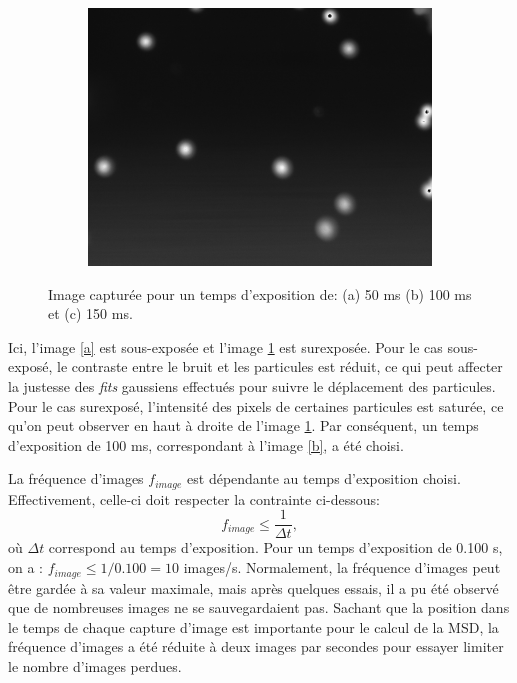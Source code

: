 \documentclass[11pt,letterpaper]{article}
\begin{document}
\begin{figure}[H]
\begin{subfigure}{0.3\textwidth}
    \includegraphics[width=\textwidth]{essai_10um_1im_150ms.png}
    \caption{}
    \label{c}
  \end{subfigure}
  \caption{Image capturée pour un temps d'exposition de: (a) 50 ms (b) 100 ms et (c) 150 ms.}
      \label{exposition}
\end{figure}
Ici, l'image \ref{a} est sous-exposée et l'image \ref{c} est surexposée. Pour le cas sous-exposé, le contraste entre
le bruit et les particules est réduit, ce qui peut affecter la justesse des \textit{fits} gaussiens effectués pour suivre
le déplacement des particules. Pour le cas surexposé, l'intensité des pixels de certaines particules est saturée, ce qu'on peut
observer en haut à droite de l'image \ref{c}. Par conséquent, un temps d'exposition de 100 ms, correspondant à l'image \ref{b}, a été choisi.

La fréquence d'images $f_{image}$ est dépendante au temps d'exposition choisi. Effectivement, celle-ci doit respecter la contrainte
ci-dessous:
\begin{equation*}
  f_{image}\leq \frac{1}{\Delta t},
\end{equation*}
où $\Delta t$ correspond au temps d'exposition. Pour un temps d'exposition de 0.100 s, on a : $f_{image}\leq 1/0.100 = 10$ images/s. 
Normalement, la fréquence d'images peut être gardée à sa valeur maximale, mais après quelques essais, il a pu été observé que de nombreuses
images ne se sauvegardaient pas. Sachant que la position dans le temps de chaque capture d'image est importante pour le calcul de la MSD, la fréquence 
d'images a été réduite à deux images par secondes pour essayer limiter le nombre d'images perdues. 
\end{document}
